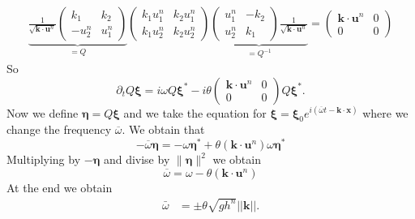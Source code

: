 \documentclass[a4paper, 11pt]{article}
\begin{document}
\begin{equation*}
\begin{split}
\underbrace{\frac{1}{\sqrt{\boldsymbol{k}\cdot \boldsymbol{u}^n}}
\begin{pmatrix}
k_1&k_2\\-u_2^n&u_1^n
\end{pmatrix}}_{=Q}\begin{pmatrix}k_1u_1^n&k_2u_1^n\\k_1u_2^n&k_2u_2^n\end{pmatrix}\underbrace{\begin{pmatrix}u_1^n&-k_2\\u_2^n&k_1\end{pmatrix}\frac{1}{\sqrt{\boldsymbol{k}\cdot \boldsymbol{u}^n}}}_{=Q^{-1}}=\begin{pmatrix}\boldsymbol{k}\cdot \boldsymbol{u}^n&0\\0&0\end{pmatrix}
\end{split}
\end{equation*}
So \begin{equation*}
\partial_t Q\boldsymbol{\xi}=i\omega Q\boldsymbol{\xi}^*-i\theta\begin{pmatrix}\boldsymbol{k}\cdot \boldsymbol{u}^n&0\\0&0\end{pmatrix}Q\boldsymbol{\xi}^*.
\end{equation*}
Now we define $\boldsymbol{\eta}=Q\boldsymbol{\xi}$  and we take the equation for $\boldsymbol{\xi}=\boldsymbol{\xi}_0e^{i(\overline{\omega} t-\boldsymbol{k}\cdot \boldsymbol{x})}$ where we change the frequency $\overline{\omega}$. We obtain that
\begin{equation*}
- \overline{\omega} \boldsymbol{\eta}=- \omega\boldsymbol{\eta}^*+\theta(\boldsymbol{k}\cdot \boldsymbol{u}^n) \omega \boldsymbol{\eta}^*\end{equation*}
Multiplying by  $-\boldsymbol{\eta}$ and divise by  $\parallel\boldsymbol{\eta}\parallel^2$ we obtain
$$
\overline{\omega}=\omega -\theta(\boldsymbol{k}\cdot \boldsymbol{u}^n)
$$
At the end we obtain
\begin{align*}
\bar{\omega} &=\pm\theta\sqrt{gh^n}||\boldsymbol{k}||.
\end{align*}
\end{document}
